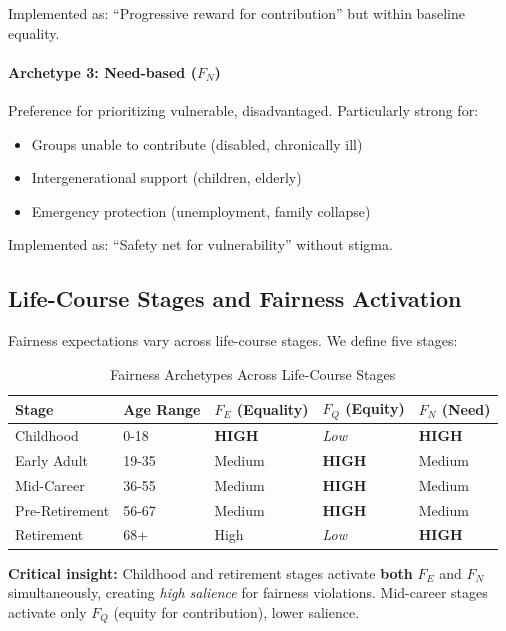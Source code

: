 Implemented as: ``Progressive reward for contribution'' but within baseline equality.

\paragraph{Archetype 3: Need-based ($F_N$)}
Preference for prioritizing vulnerable, disadvantaged. Particularly strong for:
\begin{itemize}[nosep]
\item Groups unable to contribute (disabled, chronically ill)
\item Intergenerational support (children, elderly)
\item Emergency protection (unemployment, family collapse)
\end{itemize}

Implemented as: ``Safety net for vulnerability'' without stigma.

\subsection{Life-Course Stages and Fairness Activation}

Fairness expectations vary across life-course stages. We define five stages:

\begin{table}[htbp]
\centering
\caption{Fairness Archetypes Across Life-Course Stages}
\label{tab:cm-lifecycle}
\renewcommand{\arraystretch}{1.5}
\begin{tabular}{@{}p{1.2cm}p{1.8cm}p{1.5cm}p{1.5cm}p{1.5cm}@{}}
\toprule
\textbf{Stage} & \textbf{Age Range} & $F_E$
(Equality) & $F_Q$ (Equity) & $F_N$ (Need) \\
\midrule
Childhood & 0-18 & \textbf{HIGH} & \textit{Low} & \textbf{HIGH} \\
Early Adult & 19-35 & Medium & \textbf{HIGH} & Medium \\
Mid-Career & 36-55 & Medium & \textbf{HIGH} & Medium \\
Pre-Retirement & 56-67 & Medium & \textbf{HIGH} & Medium \\
Retirement & 68+ & High & \textit{Low} & \textbf{HIGH} \\
\bottomrule
\end{tabular}
\end{table}

\textbf{Critical insight:} Childhood and retirement stages activate \textbf{both} $F_E$ and $F_N$
simultaneously, creating \textit{high salience} for fairness violations. Mid-career stages activate
only $F_Q$ (equity for contribution), lower salience.

